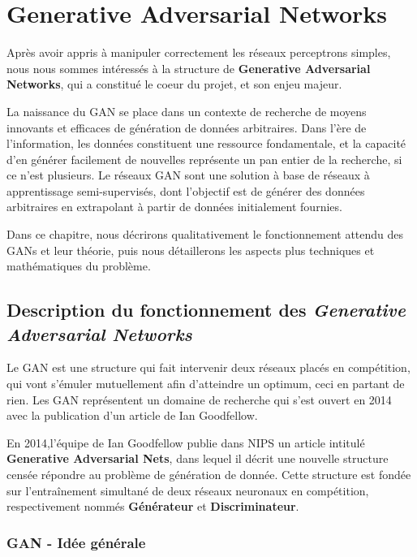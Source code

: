 \chapter{Generative Adversarial Networks}

Après avoir appris à manipuler correctement les réseaux perceptrons simples, nous nous sommes intéressés à la structure de \textbf{Generative Adversarial Networks}, qui a constitué le coeur du projet, et son enjeu majeur. 

La naissance du GAN se place dans un contexte de recherche de moyens innovants et efficaces de génération de données arbitraires. Dans l'ère de l'information, les données constituent une ressource fondamentale, et la capacité d'en générer facilement de nouvelles représente un pan entier de la recherche, si ce n'est plusieurs. Le réseaux GAN sont une solution à base de réseaux à apprentissage semi-supervisés, dont l'objectif est de générer des données arbitraires en extrapolant à partir de données initialement fournies.

Dans ce chapitre, nous décrirons qualitativement le fonctionnement attendu des GANs et leur théorie, puis nous détaillerons les aspects plus techniques et mathématiques du problème. 

\section{Description du fonctionnement des \textit{Generative Adversarial Networks}}

Le GAN est une structure qui fait intervenir deux réseaux placés en compétition, qui vont s'émuler mutuellement afin d'atteindre un optimum, ceci en partant de rien. Les GAN représentent un domaine de recherche qui s'est ouvert en 2014 avec la publication d'un article de Ian Goodfellow.

En 2014,l'équipe de Ian Goodfellow publie dans NIPS un article intitulé \textbf{Generative Adversarial Nets}, dans lequel il décrit une nouvelle structure censée répondre au problème de génération de donnée. Cette structure est fondée sur l'entraînement simultané de deux réseaux neuronaux en compétition, respectivement nommés \textbf{Générateur} et \textbf{Discriminateur}.  


\subsection{GAN - Idée générale}

